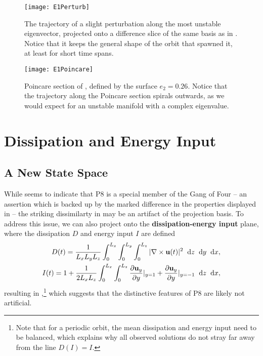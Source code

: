 \begin{figure}[h!]
\centerline{\texttt{[image: E1Perturb]}}
\caption{The trajectory of a slight perturbation along the most unstable eigenvector, projected onto a difference slice of the same basis as in . Notice that it keeps the general shape of the orbit that spawned it, at least for short time spans.}\label{fig:p8E1}
\end{figure}

\begin{figure}[h!]
\centerline{\texttt{[image: E1Poincare]}}
\caption{Poincare section of , defined by the surface $e_2 = 0.26$. Notice that the trajectory along the Poincare section spirals outwards, as we would expect for an unstable manifold with a complex eigenvalue.}\label{fig:E1Poincare}
\end{figure}

\section{Dissipation and Energy Input} 
  
\subsection{A New State Space}
While  seems to indicate that P8 is a special member of the Gang of Four -- an assertion which is backed up by the marked difference in the properties displayed in  -- the striking dissimilarty in  may be an artifact of the projection basis. To address this issue, we can also project onto the {\bf dissipation-energy input} plane, where the dissipation $D$ and energy input $I$ are defined
\begin{align}
D(t) = \frac{1}{L_xL_yL_z}\int{0}{L_x}{\int{0}{L_y}{\int{0}{L_z}{|\nabla\times\Vector{u}(t)|^2}{\textrm{d}z}}{\textrm{d}y}}{\textrm{d}x},\\
I(t)  = 1 + \frac{1}{2L_xL_z}\int{0}{L_x}{\int{0}{L_z}{\pder{1}{\Vector{u}_{y}}{y} |_{y=1}+\pder{1}{\Vector{u}_{y}}{y} |_{y=-1}}{\textrm{d}z}}{\textrm{d}x},
\end{align} 
resulting in ,\footnote{Note that for a periodic orbit, the mean dissipation and energy input need to be balanced, which explains why all observed solutions do not stray far away from the line $D(I) = I$.} which suggests that the distinctive features of P8 are likely not artificial.  

